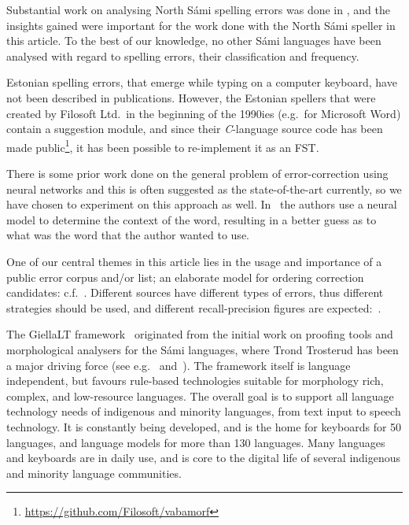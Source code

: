 \documentclass{flammie}
\begin{document}
Substantial work on analysing North Sámi spelling errors was done in
\cite{antonsen2013callinmeattahusaid}, and the insights gained were important
for the work done with the North Sámi speller in this article. To the best of
our knowledge, no other Sámi languages have been analysed with regard to
spelling errors, their classification and frequency.

Estonian spelling errors, that emerge while typing on a computer keyboard, have
not been described in publications. However, the Estonian spellers that were
created by Filosoft Ltd.\ in the beginning of the 1990ies (e.g.\ for Microsoft
Word) contain a suggestion module, and since their \textit{C}-language source
code has been made public\footnote{\url{https://github.com/Filosoft/vabamorf}},
it has been possible to re-implement it as an FST.\@

There is some prior work done on the general problem of error-correction using
neural networks and this is often suggested as the state-of-the-art currently,
so we have chosen to experiment on this approach as well.
In~\cite{li2020context} the authors use a neural model to determine the context
of the word, resulting in a better guess as to what was the word that the author
wanted to use.


One of our central themes in this article lies in the usage and importance of a
public error corpus and/or list; an elaborate model for ordering correction
candidates: c.f.~\cite{flor2019benchmark}.  Different sources have different
types of errors, thus different strategies should be used, and different
recall-precision figures are expected:~\cite{beeksma2018detecting}.

The GiellaLT framework~\cite{moshagen2013building} originated from the initial
work on proofing tools and morphological analysers for the Sámi languages, where
Trond Trosterud has been a major driving force (see
e.g.~\cite{trosterud2005samisk} and~\cite{trosterud2007disambiguering}). The
framework itself is language independent, but favours rule-based technologies
suitable for morphology rich, complex, and low-resource languages. The overall
goal is to support all language technology needs of indigenous and minority
languages, from text input to speech technology. It is constantly being
developed, and is the home for keyboards for 50 languages, and language models
for more than 130 languages. Many languages and keyboards are in daily use, and
is core to the digital life of several indigenous and minority language
communities.
\end{document}
